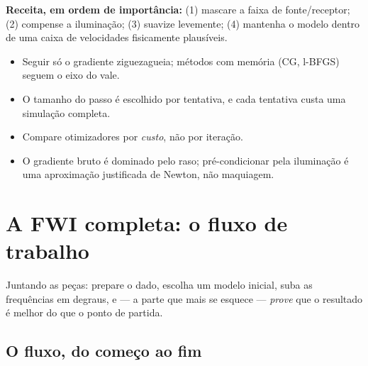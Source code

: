 \documentclass[11pt,a4paper,oneside]{report}
\begin{document}
\textbf{Receita, em ordem de import\^ancia:} (1) mascare a faixa de
fonte/receptor; (2) compense a ilumina\c{c}\~ao; (3) suavize levemente;
(4) mantenha o modelo dentro de uma caixa de velocidades fisicamente
plaus\'iveis.

\begin{resumo}
\begin{itemize}[leftmargin=*, itemsep=1pt]
\item Seguir s\'o o gradiente ziguezagueia; m\'etodos com mem\'oria (CG,
l-BFGS) seguem o eixo do vale.
\item O tamanho do passo \'e escolhido por tentativa, e cada tentativa custa
uma simula\c{c}\~ao completa.
\item Compare otimizadores por \emph{custo}, n\~ao por itera\c{c}\~ao.
\item O gradiente bruto \'e dominado pelo raso; pr\'e-condicionar pela
ilumina\c{c}\~ao \'e uma aproxima\c{c}\~ao justificada de Newton, n\~ao
maquiagem.
\end{itemize}
\end{resumo}

\chapter{A FWI completa: o fluxo de trabalho}
\label{cap:completa}

\begin{ideia}
Juntando as pe\c{c}as: prepare o dado, escolha um modelo inicial, suba as
frequ\^encias em degraus, e --- a parte que mais se esquece --- \emph{prove}
que o resultado \'e melhor do que o ponto de partida.
\end{ideia}

\section{O fluxo, do come\c{c}o ao fim}
\end{document}
